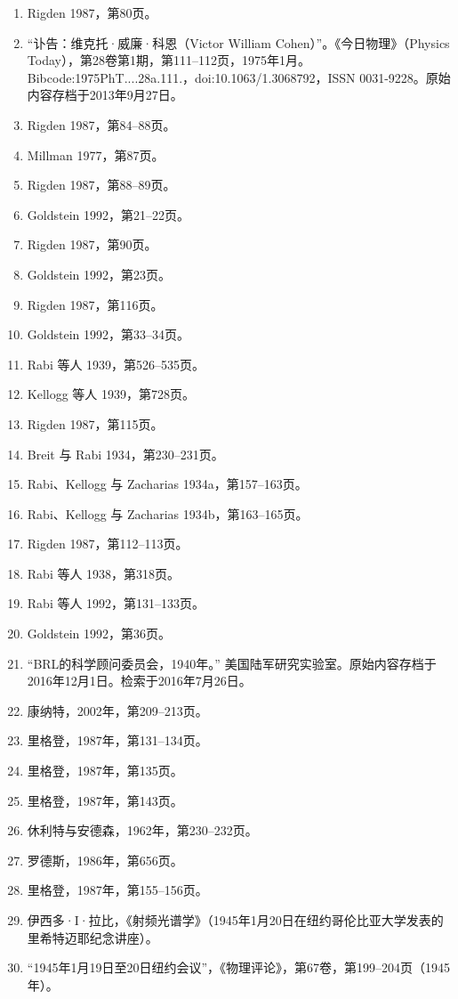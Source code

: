\begin{enumerate}
\item Rigden 1987，第80页。
\item “讣告：维克托·威廉·科恩（Victor William Cohen）”。《今日物理》（Physics Today），第28卷第1期，第111–112页，1975年1月。Bibcode:1975PhT....28a.111.，doi:10.1063/1.3068792，ISSN 0031-9228。原始内容存档于2013年9月27日。
\item Rigden 1987，第84–88页。
\item Millman 1977，第87页。
\item Rigden 1987，第88–89页。
\item Goldstein 1992，第21–22页。
\item Rigden 1987，第90页。
\item Goldstein 1992，第23页。
\item Rigden 1987，第116页。
\item Goldstein 1992，第33–34页。
\item Rabi 等人 1939，第526–535页。
\item Kellogg 等人 1939，第728页。
\item Rigden 1987，第115页。
\item Breit 与 Rabi 1934，第230–231页。
\item Rabi、Kellogg 与 Zacharias 1934a，第157–163页。
\item Rabi、Kellogg 与 Zacharias 1934b，第163–165页。
\item Rigden 1987，第112–113页。
\item Rabi 等人 1938，第318页。
\item Rabi 等人 1992，第131–133页。
\item Goldstein 1992，第36页。
\item “BRL的科学顾问委员会，1940年。” 美国陆军研究实验室。原始内容存档于2016年12月1日。检索于2016年7月26日。
\item 康纳特，2002年，第209–213页。
\item 里格登，1987年，第131–134页。
\item 里格登，1987年，第135页。
\item 里格登，1987年，第143页。
\item 休利特与安德森，1962年，第230–232页。
\item 罗德斯，1986年，第656页。
\item 里格登，1987年，第155–156页。
\item 伊西多·I·拉比，《射频光谱学》（1945年1月20日在纽约哥伦比亚大学发表的里希特迈耶纪念讲座）。
\item “1945年1月19日至20日纽约会议”，《物理评论》，第67卷，第199–204页（1945年）。

\end{enumerate}
